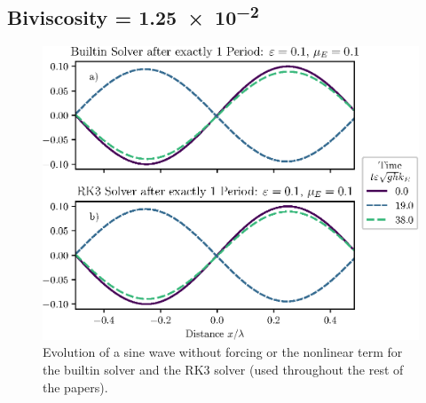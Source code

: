 \documentclass{jfm}
\let\Oldsubsection\subsection
\renewcommand{\subsection}{\FloatBarrier\Oldsubsection}
\begin{document}
\subsection{Biviscosity = \num{1.25e-2}}
\begin{figure}
  \centering
  \includegraphics{TrigVerf.eps}
  \caption{
    Evolution of a sine wave without forcing or the nonlinear term for
    the builtin solver and the RK3 solver (used throughout the rest of
    the papers).
  }
\end{figure}
\end{document}
